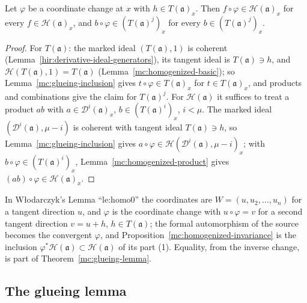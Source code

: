 \begin{proposition}
\label{mc:homogenized-invariance}
\leanok
Let \(\varphi\) be a coordinate change at \(x\) with \(h\in T(\mathfrak a)_x\). Then \(f\circ\varphi\in\mathcal H(\mathfrak a)_x\) for every \(f\in\mathcal H(\mathfrak a)_x\), and
\(b\circ\varphi\in(T(\mathfrak a)^j)_x\) for every \(b\in(T(\mathfrak a)^j)_x\).
\end{proposition}
\begin{proof}
\leanok
For \(T(\mathfrak a)\): the marked ideal \((T(\mathfrak a),1)\) is coherent (Lemma~\ref{hir:derivative-ideal-generators}), its tangent ideal is \(T(\mathfrak a)\ni h\), and
\(\mathcal H(T(\mathfrak a),1)=T(\mathfrak a)\) (Lemma~\ref{mc:homogenized-basic}); so Lemma~\ref{mc:glueing-inclusion} gives \(t\circ\varphi\in T(\mathfrak a)_x\) for
\(t\in T(\mathfrak a)_x\), and products and combinations give the claim for \(T(\mathfrak a)^j\). For \(\mathcal H(\mathfrak a)\) it suffices to treat a product
\(ab\) with \(a\in\mathcal D^i(\mathfrak a)_x\), \(b\in(T(\mathfrak a)^i)_x\), \(i<\mu\). The marked ideal \((\mathcal D^i(\mathfrak a),\mu-i)\) is coherent with tangent ideal
\(T(\mathfrak a)\ni h\), so Lemma~\ref{mc:glueing-inclusion} gives \(a\circ\varphi\in\mathcal H(\mathcal D^i(\mathfrak a),\mu-i)_x\); with \(b\circ\varphi\in(T(\mathfrak a)^i)_x\),
Lemma~\ref{mc:homogenized-product} gives \((ab)\circ\varphi\in\mathcal H(\mathfrak a)_x\).
\end{proof}
In Włodarczyk's Lemma ``le:homo0'' the coordinates are \(W=(u,u_2,\dots,u_n)\) for a tangent direction \(u\), and \(\varphi\) is the coordinate change with
\(u\circ\varphi=v\) for a second tangent direction \(v=u+h\), \(h\in T(\mathfrak a)\); the formal automorphism of the source becomes the convergent \(\varphi\), and
Proposition~\ref{mc:homogenized-invariance} is the inclusion \(\varphi^*\mathcal H(\mathfrak a)\subset\mathcal H(\mathfrak a)\) of its part (1). Equality, from the
inverse change, is part of Theorem~\ref{mc:glueing-lemma}.

\subsection{The glueing lemma}

